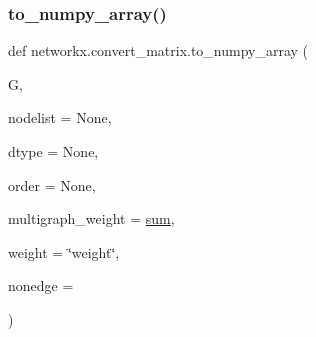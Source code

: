 \subsubsection{\texorpdfstring{to\+\_\+numpy\+\_\+array()}{to\_numpy\_array()}}
{\footnotesize\ttfamily def networkx.\+convert\+\_\+matrix.\+to\+\_\+numpy\+\_\+array (\begin{DoxyParamCaption}\item[{}]{G,  }\item[{}]{nodelist = {\ttfamily None},  }\item[{}]{dtype = {\ttfamily None},  }\item[{}]{order = {\ttfamily None},  }\item[{}]{multigraph\+\_\+weight = {\ttfamily \hyperlink{assumed__shape_2foo__free_8f90_a1c860bb40bf43c289bc16f8634733f9a}{sum}},  }\item[{}]{weight = {\ttfamily \char`\"{}weight\char`\"{}},  }\item[{}]{nonedge = {} }\end{DoxyParamCaption})}

